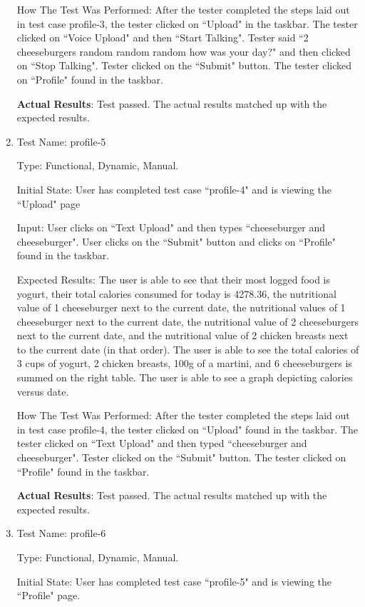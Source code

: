\documentclass[12pt, titlepage]{article}
\begin{document}
\begin{enumerate}
		How The Test Was Performed: After the tester completed the steps laid out in test case profile-3, the tester clicked on ``Upload" in the taskbar. The tester clicked on ``Voice Upload" and then ``Start Talking". Tester said ``2 cheeseburgers random random random how was your day?" and then clicked on ``Stop Talking". Tester clicked on the ``Submit" button. The tester clicked on ``Profile" found in the taskbar.
		
		\textbf{Actual Results}: Test passed. The actual results matched up with the expected results.
		
		\item{Test Name: profile-5}
		
		Type: Functional, Dynamic, Manual.
		
		Initial State: User has completed test case ``profile-4" and is viewing the ``Upload" page
		
		Input: User clicks on ``Text Upload" and then types ``cheeseburger and cheeseburger". User clicks on the ``Submit" button and clicks on ``Profile" found in the taskbar.
		
		Expected Results: The user is able to see that their most logged food is yogurt, their total calories consumed for today is 4278.36, the nutritional value of 1 cheeseburger next to the current date, the nutritional values of 1 cheeseburger next to the current date, the nutritional value of 2 cheeseburgers next to the current date, and the nutritional value of 2 chicken breasts next to the current date (in that order). The user is able to see the total calories of 3 cups of yogurt, 2 chicken breasts, 100g of a martini, and 6 cheeseburgers is summed on the right table. The user is able to see a graph depicting calories versus date.
		
		How The Test Was Performed: After the tester completed the steps laid out in test case profile-4, the tester clicked on ``Upload" found in the taskbar. The tester clicked on ``Text Upload" and then typed ``cheeseburger and cheeseburger". Tester clicked on the ``Submit" button. The tester clicked on ``Profile" found in the taskbar.
		
		\textbf{Actual Results}: Test passed. The actual results matched up with the expected results.
		
		\item{Test Name: profile-6}
		
		Type: Functional, Dynamic, Manual.
		
		Initial State: User has completed test case ``profile-5" and is viewing the ``Profile" page.
		

\end{enumerate}
\end{document}
